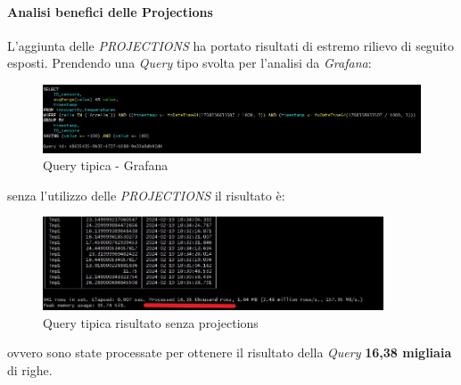     \paragraph{Analisi benefici delle Projections}\label{sec:temp_projections_benefici}
    L'aggiunta delle \textit{PROJECTIONS} ha portato risultati di estremo rilievo di seguito esposti.
    Prendendo una \textit{Query} tipo svolta per l'analisi da \textit{Grafana}:
    \begin{figure}[H]
        \centering
        \includegraphics[width=1\textwidth]{../Images/SpecificaTecnica/ProjectionQuery.jpg}
        \caption{Query tipica - Grafana}
        \label{fig:ProjectionsQuery}
      \end{figure}
    senza l'utilizzo delle \textit{PROJECTIONS} il risultato è:
    \begin{figure}[H]
        \centering
        \includegraphics[width=0.9\textwidth]{../Images/SpecificaTecnica/SenzaProectionResult.jpg}
        \caption{Query tipica risultato senza projections}
        \label{fig:ProjectionsQueryWthout}
      \end{figure}
      ovvero sono state processate per ottenere il risultato della \textit{Query} \textbf{16,38 migliaia} di righe.

